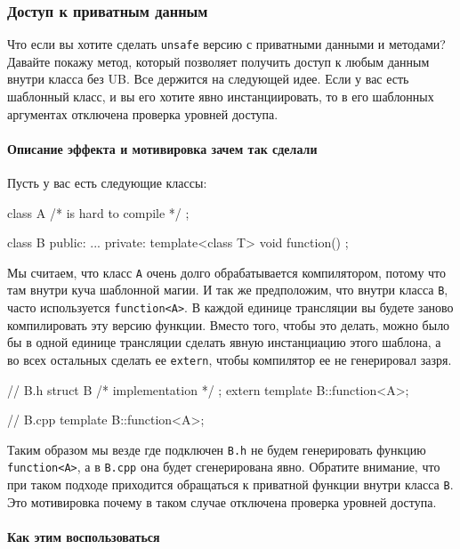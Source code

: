 \subsubsection{Доступ к приватным данным}

Что если вы хотите сделать \verb"unsafe" версию с приватными данными и методами?
Давайте покажу метод, который позволяет получить доступ к любым данным внутри класса без UB.
Все держится на следующей идее.
Если у вас есть шаблонный класс, и вы его хотите явно инстанциировать, то в его шаблонных аргументах отключена проверка уровней доступа.

\paragraph{Описание эффекта и мотивировка зачем так сделали}

Пусть у вас есть следующие классы:
\begin{cppcode}
class A {
  /* is hard to compile */
};

class B {
public:
  ...
private:
  template<class T>
  void function() {}
};
\end{cppcode}
Мы считаем, что класс \verb"A" очень долго обрабатывается компилятором, потому что там внутри куча шаблонной магии.
И так же предположим, что внутри класса \verb"B", часто используется \verb"function<A>".
В каждой единице трансляции вы будете заново компилировать эту версию функции.
Вместо того, чтобы это делать, можно было бы в одной единице трансляции сделать явную инстанциацию этого шаблона, а во всех остальных сделать ее \verb"extern", чтобы компилятор ее не генерировал зазря.
\begin{cppcode}
// B.h
struct B { /* implementation */ };
extern template B::function<A>;

// B.cpp
template B::function<A>;
\end{cppcode}
Таким образом мы везде где подключен \verb"B.h" не будем генерировать функцию \verb"function<A>", а в \verb"B.cpp" она будет сгенерирована явно.
Обратите внимание, что при таком подходе приходится обращаться к приватной функции внутри класса \verb"B".
Это мотивировка почему в таком случае отключена проверка уровней доступа.

\paragraph{Как этим воспользоваться}

